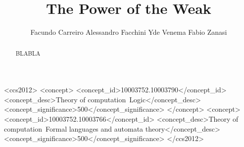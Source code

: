 \documentclass[prodmode,acmtecs]{acmsmall} %
\begin{document}

\title{The Power of the Weak}

\author{
Facundo Carreiro
Alessandro Facchini
Yde Venema
Fabio Zanasi
}

\begin{abstract}
BLABLA
\end{abstract}


%
%
 \begin{CCSXML}
<ccs2012>
<concept>
 <concept_id>10003752.10003790</concept_id>
 <concept_desc>Theory of computation~Logic</concept_desc>
 <concept_significance>500</concept_significance>
 </concept>
 <concept>
 <concept_id>10003752.10003766</concept_id>
 <concept_desc>Theory of computation~Formal languages and automata theory</concept_desc>
 <concept_significance>500</concept_significance>
</ccs2012>
\end{CCSXML}






\maketitle
\end{document}
